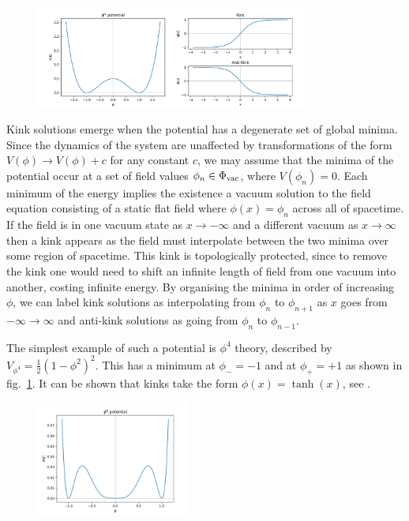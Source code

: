 \documentclass[11pt, oneside]{article}  	%
\numberwithin{equation}{section}
\begin{document}
 \begin{figure}
\centering
 \includegraphics[width=0.8\textwidth]{phi4_potential.png}
  \label{phi4pot}
\end{figure}
Kink solutions emerge when the potential has a degenerate set of global minima. Since the dynamics of the system are unaffected by transformations of the form $V(\phi)\rightarrow V(\phi) + c$ for any constant $c$, we may assume that the minima of the potential occur at a set of field values $\phi_n \in \Phi_{\textup{vac}}$, where $V(\phi_n) = 0$. Each minimum of the energy implies the existence a vacuum solution to the field equation consisting of a static flat field where $\phi(x) = \phi_n$ across all of spacetime. If the field is in one vacuum state as $x\rightarrow -\infty$ and a different vacuum as $x\rightarrow \infty$ then a kink appears as the field must interpolate between the two minima over some region of spacetime. This kink is topologically protected, since to remove the kink one would need to shift an infinite length of field from one vacuum into another, costing infinite energy. By organising the minima in order of increasing $\phi$, we can label kink solutions as interpolating from $\phi_n$ to $\phi_{n+1}$ as $x$ goes from $-\infty \rightarrow \infty$ and anti-kink solutions as going from $\phi_n$ to $\phi_{n-1}$.\par
 The simplest example of such a potential is $\phi^4$ theory, described by $V_{\phi^4} = \frac{1}{2} (1-\phi^2)^2$. This has a minimum at $\phi_{-} = -1$ and at $\phi_{+} = +1$ as shown in fig.~\ref{phi4pot}. It can be shown that kinks take the form $\phi(x) = \tanh(x)$, see \cite{manton-book}.\par
 \begin{figure}
\vspace{-10pt}
\centering
 \includegraphics[width=0.45\textwidth]{phi8_potential.png}
  \label{phi8pot}
\end{figure}
\end{document}
